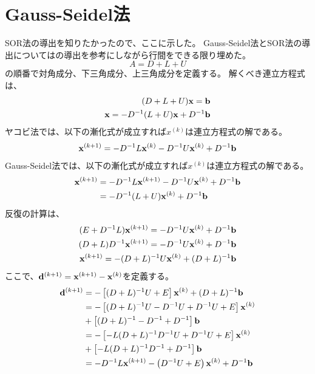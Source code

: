 \documentclass{jsarticle}
\date{\today}
\author{山田龍}
\title{}
\newcommand{\kakko}[1][]{(#1)}
\newcommand{\bx}{\bold{x}}
\newcommand{\bb}{\bold{b}}
\newcommand{\bd}{\bold{d}}
\begin{document}
\maketitle
\section{Gauss-Seidel法}
SOR法の導出を知りたかったので、ここに示した。
Gauss-Seidel法とSOR法の導出については\cite{suuchi}の導出を参考にしながら行間をできる限り埋めた。
\begin{equation}
    A = D + L + U
\end{equation}
の順番で対角成分、下三角成分、上三角成分を定義する。
解くべき連立方程式は、
\begin{align}
  (D + L + U)\bx = \bb  \\
  \bx = -D^{-1}(L + U)\bx +  D^{-1} \bb 
\end{align}
ヤコビ法では、以下の漸化式が成立すれば$x^{\kakko[k]}$は連立方程式の解である。
\begin{equation}
    \bx^{\kakko[k+1]} = - D^{-1} L \bx^{\kakko[k]}\\
    - D^{-1} U \bx^{\kakko[k]} + D^{-1}\bold{b} 
\end{equation}
Gauss-Seidel法では、以下の漸化式が成立すれば$x^{\kakko[k]}$は連立方程式の解である。
\begin{align}
    \bx^{\kakko[k+1]} &= - D^{-1} L \bx^{\kakko[k+1]}
    - D^{-1} U \bx^{\kakko[k]} + D^{-1}\bold{b}\\
    &=- D^{-1} (L + U) \bx^{\kakko[k]} + D^{-1}\bold{b} 
\end{align}
反復の計算は、
\begin{align*}
    (E + D^{-1}L)\bx^{\kakko[k+1]} = - D^{-1} U \bx^{\kakko[k]} + D^{-1}\bold{b}\\
    (D + L)D^{-1}\bx^{\kakko[k+1]} = - D^{-1} U \bx^{\kakko[k]} + D^{-1}\bold{b}\\
    \bx^{\kakko[k+1]} = - (D + L)^{-1}U \bx^{\kakko[k]} +(D + L)^{-1}\bold{b}\\
\end{align*}
ここで、$\bd^{\kakko[k+1]} = \bx^{\kakko[k+1]} - \bx^{\kakko[k]}$を定義する。
\begin{align*}
  \bd^{\kakko[k+1]} &= - \left[ (D + L)^{-1}U + E\right] \bx^{\kakko[k]} + (D + L)^{-1}\bb\\
  &= - \left[ (D + L)^{-1}U - D^{-1}U + D^{-1}U+ E\right] \bx^{\kakko[k]}\\
  &+ \left[(D + L)^{-1} - D^{-1} + D^{-1}\right]\bb\\
  &= - \left[ - L(D + L)^{-1}D^{-1}U + D^{-1}U+ E\right] \bx^{\kakko[k]}\\
  &+ \left[- L(D + L)^{-1}D^{-1}+ D^{-1}\right]\bb\\
  &= - D^{-1}L \bx^{\kakko[k+1]}- \left( D^{-1}U+ E\right) \bx^{\kakko[k]} + D^{-1}\bb
\end{align*}
\end{document}
